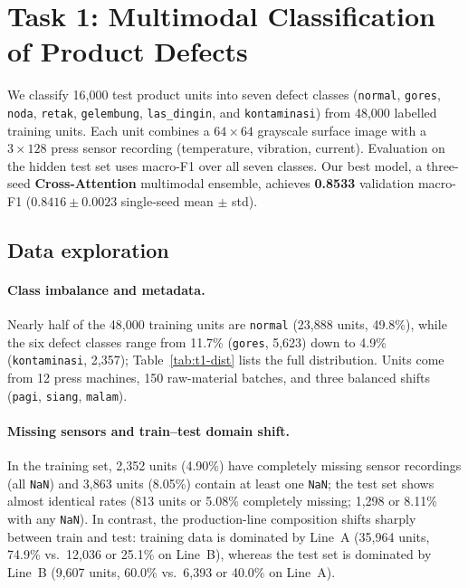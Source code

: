\section{Task 1: Multimodal Classification of Product Defects}
\label{sec:t1}

We classify 16{,}000 test product units into seven defect classes (\texttt{normal}, \texttt{gores},
\texttt{noda}, \texttt{retak}, \texttt{gelembung}, \texttt{las\_dingin}, and \texttt{kontaminasi})
from 48{,}000 labelled training units. Each unit combines a $64 \times 64$ grayscale surface image
with a $3 \times 128$ press sensor recording (temperature, vibration, current). Evaluation on the
hidden test set uses macro-F1 over all seven classes. Our best model, a three-seed
\textbf{Cross-Attention} multimodal ensemble, achieves \textbf{0.8533} validation macro-F1
($0.8416 \pm 0.0023$ single-seed mean $\pm$ std).

\subsection{Data exploration}
\label{sec:t1-eda}

\paragraph{Class imbalance and metadata.} Nearly half of the 48{,}000 training units are
\texttt{normal} (23{,}888 units, 49.8\%), while the six defect classes range from 11.7\%
(\texttt{gores}, 5{,}623) down to 4.9\% (\texttt{kontaminasi}, 2{,}357); Table~\ref{tab:t1-dist}
lists the full distribution. Units come from 12 press machines, 150 raw-material batches, and three
balanced shifts (\texttt{pagi}, \texttt{siang}, \texttt{malam}).

\paragraph{Missing sensors and train--test domain shift.} In the training set, 2{,}352 units
(4.90\%) have completely missing sensor recordings (all \texttt{NaN}) and 3{,}863 units (8.05\%)
contain at least one \texttt{NaN}; the test set shows almost identical rates (813 units or 5.08\%
completely missing; 1{,}298 or 8.11\% with any \texttt{NaN}). In contrast, the production-line
composition shifts sharply between train and test: training data is dominated by Line~A
(35{,}964 units, 74.9\% vs.\ 12{,}036 or 25.1\% on Line~B), whereas the test set is dominated by
Line~B (9{,}607 units, 60.0\% vs.\ 6{,}393 or 40.0\% on Line~A).


